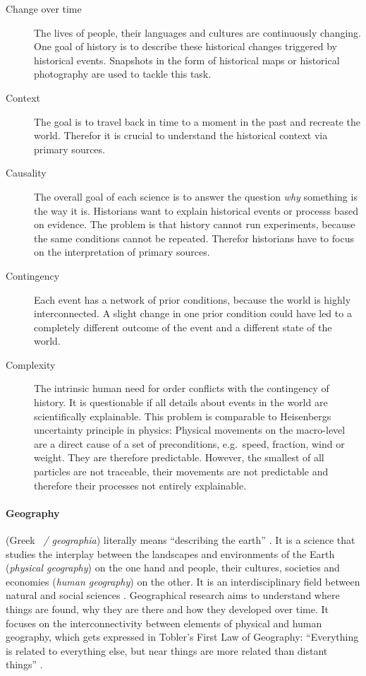 \vspace{-1em}
\begin{description} %
  \item[Change over time]
  The lives of people, their languages and cultures are continuously changing. One goal of history is to describe these historical changes triggered by historical events. Snapshots in the form of historical maps or historical photography are used to tackle this task.
  \item[Context] The goal is to travel back in time to a moment in the past and recreate the world. Therefor it is crucial to understand the historical context via primary sources.
  \item[Causality]
  The overall goal of each science is to answer the question \emph{why} something is the way it is. Historians want to explain historical events or processs based on evidence. The problem is that history cannot run experiments, because the same conditions cannot be repeated. Therefor historians have to focus on the interpretation of primary sources.
  \item[Contingency]
  Each event has a network of prior conditions, because the world is highly interconnected. A slight change in one prior condition could have led to a completely different outcome of the event and a different state of the world.
  \item[Complexity]
  The intrinsic human need for order conflicts with the contingency of history. It is questionable if all details about events in the world are scientifically explainable.
  This problem is comparable to Heisenbergs uncertainty principle in physics: Physical movements on the macro-level are a direct cause of a set of preconditions, e.g.\ speed, fraction, wind or weight. They are therefore predictable. However, the smallest of all particles are not traceable, their movements are not predictable and therefore their processes not entirely explainable.
\end{description}

\paragraph{Geography} %
\label{par:geography}

(Greek ~\emph{\textgamma\textepsilon\textomega\textgamma\textrho\textalpha\textphi\textiota\textalpha / geographia}) literally means ``describing the earth''
\cite{dict}.
It is a science that studies the interplay between the landscapes and environments of the Earth (\emph{physical geography}) on the one hand and people, their cultures, societies and economies (\emph{human geography}) on the other. It is an interdisciplinary field between natural and social sciences
\cite{rgsGeography}. Geographical research aims to understand where things are found, why they are there and how they developed over time. It focuses on the interconnectivity between elements of physical and human geography, which gets expressed in Tobler's First Law of Geography: ``Everything is related to everything else, but near things are more related than distant things''
\cite{lawOfGeography}.


